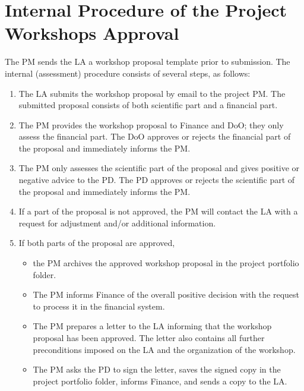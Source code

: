 
\section{Internal Procedure of the Project Workshops Approval}
\label{app:workshops}

The PM sends the LA a workshop proposal template prior to submission. The internal (assessment) procedure consists of
several steps, as follows:
\begin{enumerate}
\item The LA submits the workshop proposal by email to the project PM. The submitted proposal consists of both scientific part
and a financial part.
\item The PM provides the workshop proposal to Finance and DoO; they only assess the financial part. The DoO approves or rejects
the financial part of the proposal and immediately informs the PM.
\item The PM only assesses the scientific part of the proposal and gives positive or negative advice to the PD. The PD
approves or rejects the scientific part of the proposal and immediately informs the PM.
\item If a part of the proposal is not approved, the PM will contact the LA with a request for adjustment and/or additional
information.
\item If both parts of the proposal are approved,
\begin{itemize}
\item the PM archives the approved workshop proposal in the project portfolio folder.
\item The PM informs Finance of the overall positive decision with the request to process it in the financial system.
\item The PM prepares a letter to the LA informing that the workshop proposal has been approved. The letter also contains all
further preconditions imposed on the LA and the organization of the workshop.
\item The PM asks the PD to sign the letter, saves the signed copy in the project portfolio folder, informs Finance, and sends a
copy to the LA.
\end{itemize}
\end{enumerate}
